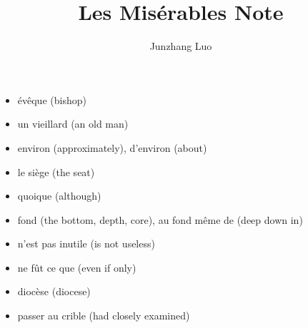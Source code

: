 \documentclass{book}
\title{Les Misérables Note}
\author{Junzhang Luo}
\begin{document}
\tableofcontents

    \begin{itemize}
        \item évêque (bishop)
        \item un vieillard (an old man)
        \item environ (approximately), d'environ (about)
        \item le siège (the seat)
        \item quoique (although)
        \item fond (the bottom, depth, core), au fond même de (deep down in)
        \item n'est pas inutile (is not useless)
        \item ne fût ce que (even if only)
        \item diocèse (diocese)
        \item passer au crible (had closely examined)
    \end{itemize}
\end{document}
